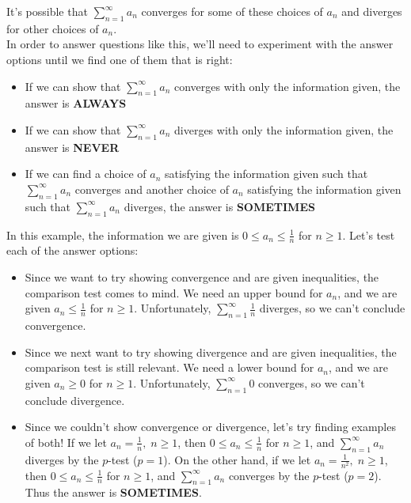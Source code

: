\documentclass{article}
\theoremstyle{definition} %
\begin{document}
It's possible that $\displaystyle\sum_{n=1}^\infty a_n$ converges for some of these choices of $a_n$ and diverges for other choices of $a_n$. \\

In order to answer questions like this, we'll need to experiment with the answer options until we find one of them that is right:

\begin{itemize}
    \item If we can show that $\displaystyle\sum_{n=1}^\infty a_n$ converges with only the information given, the answer is \textbf{ALWAYS}
    \item If we can show that $\displaystyle\sum_{n=1}^\infty a_n$ diverges with only the information given, the answer is \textbf{NEVER}
    \item If we can find a choice of $a_n$ satisfying the information given such that $\displaystyle\sum_{n=1}^\infty a_n$ converges and another choice of $a_n$ satisfying the information given such that $\displaystyle\sum_{n=1}^\infty a_n$ diverges, the answer is \textbf{SOMETIMES} 
\end{itemize}

In this example, the information we are given is $0 \leq a_n \leq \frac{1}{n}$ for $n \geq 1$. Let's test each of the answer options:

\begin{itemize}
    \item Since we want to try showing convergence and are given inequalities, the comparison test comes to mind. We need an upper bound for $a_n$, and we are given $a_n \leq \frac{1}{n}$ for $n \geq 1$. Unfortunately, $\displaystyle\sum_{n=1}^\infty \frac{1}{n}$ diverges, so we can't conclude convergence.
    \item Since we next want to try showing divergence and are given inequalities, the comparison test is still relevant. We need a lower bound for $a_n$, and we are given $a_n \geq 0$ for $n \geq 1$. Unfortunately, $\displaystyle\sum_{n=1}^\infty 0$ converges, so we can't conclude divergence.
    \item Since we couldn't show convergence or divergence, let's try finding examples of both! If we let $a_n = \frac{1}{n}, \; n \geq 1$, then $0 \leq a_n \leq \frac{1}{n}$ for $n \geq 1$, and $\displaystyle\sum_{n=1}^\infty a_n$ diverges by the $p$-test ($p = 1$). On the other hand, if we let $a_n = \frac{1}{n^2}, \; n \geq 1$, then $0 \leq a_n \leq \frac{1}{n}$ for $n \geq 1$, and $\displaystyle\sum_{n=1}^\infty a_n$ converges by the $p$-test ($p = 2$). Thus the answer is \textbf{SOMETIMES}.  
\end{itemize}
\end{document}
